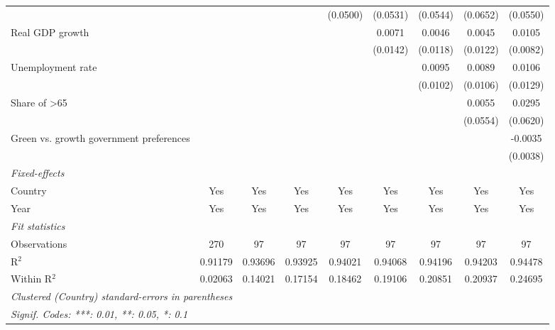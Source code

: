 \begin{table}[htbp]
\begin{tabular}{lcccccccc}
                                              &                &               &              & (0.0500)     & (0.0531) & (0.0544) & (0.0652) & (0.0550)\\   
      Real GDP growth                         &                &               &              &              & 0.0071   & 0.0046   & 0.0045   & 0.0105\\   
                                              &                &               &              &              & (0.0142) & (0.0118) & (0.0122) & (0.0082)\\   
      Unemployment rate                       &                &               &              &              &          & 0.0095   & 0.0089   & 0.0106\\   
                                              &                &               &              &              &          & (0.0102) & (0.0106) & (0.0129)\\   
      Share of >65                            &                &               &              &              &          &          & 0.0055   & 0.0295\\   
                                              &                &               &              &              &          &          & (0.0554) & (0.0620)\\   
      Green vs. growth government preferences &                &               &              &              &          &          &          & -0.0035\\   
                                              &                &               &              &              &          &          &          & (0.0038)\\   
      \midrule
      \emph{Fixed-effects}\\
      Country                                 & Yes            & Yes           & Yes          & Yes          & Yes      & Yes      & Yes      & Yes\\  
      Year                                    & Yes            & Yes           & Yes          & Yes          & Yes      & Yes      & Yes      & Yes\\  
      \midrule
      \emph{Fit statistics}\\
      Observations                            & 270            & 97            & 97           & 97           & 97       & 97       & 97       & 97\\  
      R$^2$                                   & 0.91179        & 0.93696       & 0.93925      & 0.94021      & 0.94068  & 0.94196  & 0.94203  & 0.94478\\  
      Within R$^2$                            & 0.02063        & 0.14021       & 0.17154      & 0.18462      & 0.19106  & 0.20851  & 0.20937  & 0.24695\\  
      \midrule \midrule
      \multicolumn{9}{l}{\emph{Clustered (Country) standard-errors in parentheses}}\\
      \multicolumn{9}{l}{\emph{Signif. Codes: ***: 0.01, **: 0.05, *: 0.1}}\\
   \end{tabular}
\end{table}


